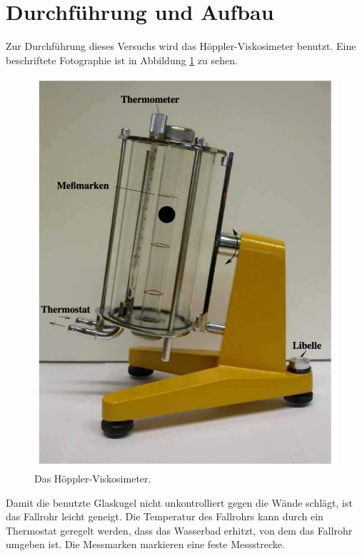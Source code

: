  \section{Durchführung und Aufbau}
\label{sec:Durchführung}

Zur Durchführung dieses Versuchs wird das Höppler-Viskosimeter benutzt.
Eine beschriftete Fotographie ist in Abbildung \ref{fig:hoeppvisko}
zu sehen.

\begin{figure}[h]
  \centering
  \includegraphics[height = 10 cm]{hoepplervisko.pdf}
  \caption{Das Höppler-Viskosimeter\cite{anleitung}.}
  \label{fig:hoeppvisko}
\end{figure}

Damit die benutzte Glaskugel nicht unkontrolliert gegen die Wände schlägt,
ist das Fallrohr leicht geneigt. Die Temperatur des Fallrohrs kann durch ein
Thermostat geregelt werden, dass das Wasserbad erhitzt, von dem das Fallrohr
umgeben ist. Die Messmarken markieren eine feste Messstrecke.

